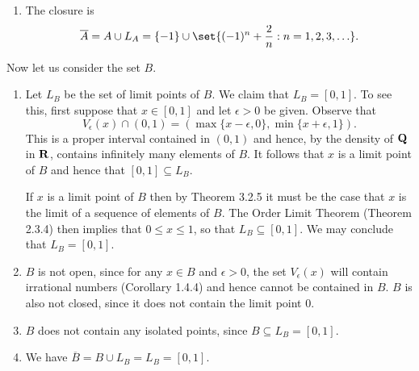 \documentclass{lew98_solutions}
\begin{document}
\begin{solution}
\begin{enumerate}
        \item The closure is
        \[
            \overline{A} = A \cup L_A = \{ -1 \} \cup \set{ (-1)^n + \frac{2}{n} : n = 1, 2, 3, \ldots }.
        \]
    \end{enumerate}

    Now let us consider the set \( B \).
    \begin{enumerate}
        \item Let \( L_B \) be the set of limit points of \( B \). We claim that \( L_B = [0, 1] \). To see this, first suppose that \( x \in [0, 1] \) and let \( \epsilon > 0 \) be given. Observe that
        \[
            V_{\epsilon}(x) \cap (0, 1) = (\max \{ x - \epsilon, 0 \}, \min \{ x + \epsilon, 1 \}).
        \]
        This is a proper interval contained in \( (0, 1) \) and hence, by the density of \( \mathbf{Q} \) in \( \mathbf{R} \), contains infinitely many elements of \( B \). It follows that \( x \) is a limit point of \( B \) and hence that \( [0, 1] \subseteq L_B \).
        
        If \( x \) is a limit point of \( B \) then by Theorem 3.2.5 it must be the case that \( x \) is the limit of a sequence of elements of \( B \). The Order Limit Theorem (Theorem 2.3.4) then implies that \( 0 \leq x \leq 1 \), so that \( L_B \subseteq [0, 1] \). We may conclude that \( L_B = [0, 1] \).

        \item \( B \) is not open, since for any \( x \in B \) and \( \epsilon > 0 \), the set \( V_{\epsilon}(x) \) will contain irrational numbers (Corollary 1.4.4) and hence cannot be contained in \( B \). \( B \) is also not closed, since it does not contain the limit point \( 0 \).

        \item \( B \) does not contain any isolated points, since \( B \subseteq L_B = [0, 1] \).

        \item We have \( \overline{B} = B \cup L_B = L_B = [0, 1] \).
    \end{enumerate}
\end{solution}
\end{document}
